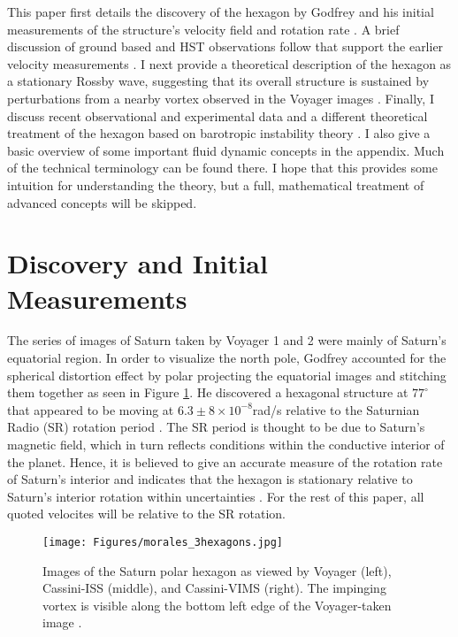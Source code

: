 \documentclass[preprint]{revtex4-1} %
\begin{document}
This paper first details the discovery of the hexagon by Godfrey and
his initial measurements of the structure's velocity field and
rotation rate \cite{Godfrey1988, Godfrey1990}.  A brief discussion of ground based and HST observations
follow that support the earlier velocity measurements
\cite{Caldwell1993, SanchezLavega1993}. I next provide a
theoretical description of the hexagon as  
a stationary Rossby wave, suggesting that its overall structure
is sustained by perturbations from a nearby
vortex observed in the Voyager images \cite{Allison1990}.  Finally, I discuss recent
observational and experimental data and a different theoretical
treatment of the hexagon based on barotropic instability theory
\cite{Fletcher2008, Baines2009, BarbosaAguiar2010, MoralesJuberias2011}.
I also give a basic overview of
some important fluid dynamic concepts in the appendix.  Much of the
technical terminology can be found there.  
I hope that this provides some intuition for understanding 
the theory, but a full, mathematical treatment of advanced concepts will be skipped.

\section{Discovery and Initial Measurements}
\label{sec:discv}
The series of images of Saturn taken by Voyager 1 and 2 were mainly of Saturn's
equatorial region.  In order to visualize the north
pole, Godfrey accounted for the spherical distortion effect by polar projecting the
equatorial images and stitching them together as seen in Figure
\ref{fig:saturnHexs}.  He discovered a hexagonal
structure at $77^{\circ}$ that appeared to be moving at
$6.3 \pm 8 \times 10^{-8}$rad/s relative to the 
Saturnian Radio (SR) rotation period  \cite{Godfrey1988}.  The SR
period is thought to be due 
to Saturn's magnetic field, which in turn reflects conditions within
the conductive interior of the planet.  Hence, it is believed to give
an accurate measure of the rotation rate of Saturn's interior and
indicates that the hexagon is stationary relative to Saturn's interior
rotation within uncertainties \cite{Godfrey1988}.  For the rest of
this paper, all quoted velocites will be relative to the SR rotation.

\begin{figure}
  \centering
  \texttt{[image: Figures/morales\_3hexagons.jpg]}
  \caption{Images of the Saturn polar hexagon as viewed by Voyager
    (left), Cassini-ISS (middle), and Cassini-VIMS (right).  The
    impinging vortex is visible along the bottom left edge of the
    Voyager-taken image \cite[fig~1]{MoralesJuberias2011}.} 
  \label{fig:saturnHexs}
\end{figure}
\end{document}

